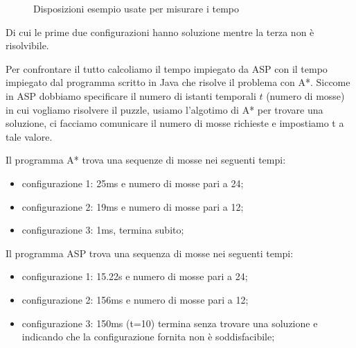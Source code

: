 \begin{figure}
\begin{minipage}{0.32\textwidth}
\end{minipage}
\caption{Disposizioni esempio usate per misurare i tempo}
\label{fig:esDisp}
\end{figure}

Di cui le prime due configurazioni hanno soluzione mentre la terza non è risolvibile. 

Per confrontare il tutto calcoliamo il tempo impiegato da ASP con il tempo impiegato dal programma scritto in Java che risolve il problema con A*. 
Siccome in ASP dobbiamo specificare il numero di istanti temporali $t$ (numero di mosse) in cui vogliamo risolvere il puzzle, usiamo l'algotimo di A* per trovare una soluzione, ci facciamo comunicare il numero di mosse richieste e impostiamo t a tale valore. 

Il programma A* trova una sequenze di mosse nei seguenti tempi: 
\begin{itemize}
    \item configurazione 1: 25ms e numero di mosse pari a 24; 
    \item configurazione 2: 19ms e numero di mosse pari a 12; 
    \item configurazione 3: 1ms, termina subito;  
\end{itemize}

Il programma ASP trova una sequenza di mosse nei seguenti tempi: 
\begin{itemize}
    \item configurazione 1: 15.22s e numero di mosse pari a 24; 
    \item configurazione 2: 156ms e numero di mosse pari a 12; 
    \item configurazione 3: 150ms (t=10) termina senza trovare una soluzione e indicando che la configurazione fornita non è soddisfacibile; 
\end{itemize}
